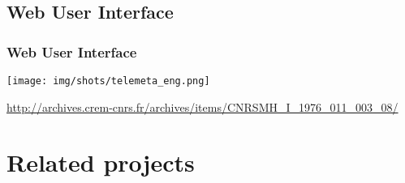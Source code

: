 \documentclass[10pt, final, hyperref, table]{beamer}
\begin{document}
\subsection{Web User Interface}
\begin{frame}\frametitle{Web User Interface}
  \vspace{-0.25cm}
  \begin{center}
    \texttt{[image: img/shots/telemeta\_eng.png]}
  \end{center}
  \tiny{\url{http://archives.crem-cnrs.fr/archives/items/CNRSMH_I_1976_011_003_08/}}
\end{frame}


\section{Related projects}
\frame{\tableofcontents[currentsection]}
\end{document}
